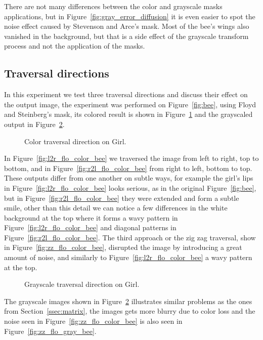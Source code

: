 \documentclass[conference]{IEEEtran}
\begin{document}
There are not many differences between the color and grayscale masks applications, but in Figure~\ref{fig:gray_error_diffusion} it is even easier to spot the noise effect caused by Stevenson and Arce's mask. Most of the bee's wings also vanished in the background, but that is a side effect of the grayscale transform process and not the application of the masks.
\subsection{Traversal directions}
In this experiment we test three traversal directions and discuss their effect on the output image, the experiment was performed on Figure~\ref{fig:bee}, using Floyd and Steinberg's mask, its colored result is shown in Figure~\ref{fig:color_traversal} and the grayscaled output in Figure~\ref{fig:gray_traversal}.
\begin{figure}[htbp]
	\centering
	\quad
	\caption{Color traversal direction on Girl.}
	\label{fig:color_traversal}
\end{figure}
In Figure~\ref{fig:l2r_flo_color_bee} we traversed the image from left to right, top to bottom, and in Figure~\ref{fig:r2l_flo_color_bee} from right to left, bottom to top. These outputs differ from one another on subtle ways, for example the girl's lips in Figure~\ref{fig:l2r_flo_color_bee} looks serious, as in the original Figure~\ref{fig:bee}, but in Figure~\ref{fig:r2l_flo_color_bee} they were extended and form a subtle smile, other than this detail we can notice a few differences in the white background at the top where it forms a wavy pattern in Figure~\ref{fig:l2r_flo_color_bee} and diagonal patterns in Figure~\ref{fig:r2l_flo_color_bee}. The third approach or the zig zag traversal, show in Figure~\ref{fig:zz_flo_color_bee}, disrupted the image by introducing a great amount of noise, and similarly to Figure~\ref{fig:l2r_flo_color_bee} a wavy pattern at the top.
\begin{figure}[htbp]
	\centering
	\quad
	\caption{Grayscale traversal direction on Girl.}
	\label{fig:gray_traversal}
\end{figure}
The grayscale images shown in Figure~\ref{fig:gray_traversal} illustrates similar problems as the ones from Section~\ref{ssec:matrix}, the images gets more blurry due to color loss and the noise seen in Figure~\ref{fig:zz_flo_color_bee} is also seen in Figure~\ref{fig:zz_flo_gray_bee}.
\end{document}
